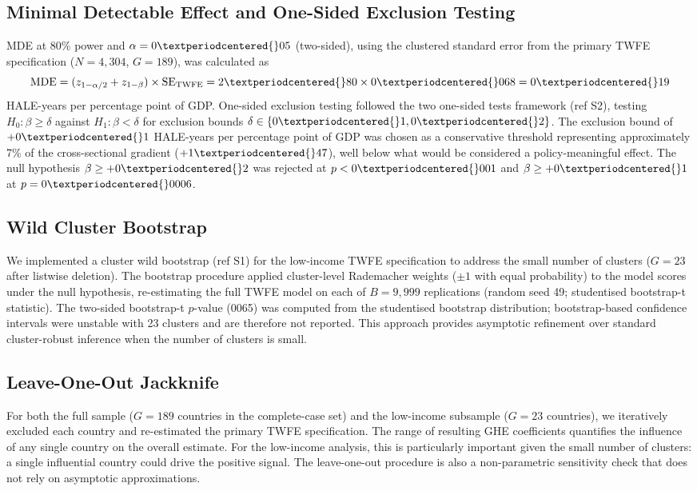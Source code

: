 \documentclass[10pt,a4paper]{article}
\begin{document}
\subsection{Minimal Detectable Effect and One-Sided Exclusion Testing}
MDE at 80\% power and $\alpha = 0{\textperiodcentered{}}05$ (two-sided), using the clustered standard error from the primary TWFE specification ($N = 4{,}304$, $G = 189$), was calculated as
\begin{equation}
\text{MDE} = (z_{1-\alpha/2} + z_{1-\beta}) \times \text{SE}_{\text{TWFE}} = 2{\textperiodcentered{}}80 \times 0{\textperiodcentered{}}068 = 0{\textperiodcentered{}}19
\end{equation}
HALE-years per percentage point of GDP. One-sided exclusion testing followed the two one-sided tests framework (ref S2), testing $H_0: \beta \geq \delta$ against $H_1: \beta < \delta$ for exclusion bounds $\delta \in \{0{\textperiodcentered{}}1, 0{\textperiodcentered{}}2\}$. The exclusion bound of $+0{\textperiodcentered{}}1$ HALE-years per percentage point of GDP was chosen as a conservative threshold representing approximately 7\% of the cross-sectional gradient ($+1{\textperiodcentered{}}47$), well below what would be considered a policy-meaningful effect. The null hypothesis $\beta \geq +0{\textperiodcentered{}}2$ was rejected at $p < 0{\textperiodcentered{}}001$ and $\beta \geq +0{\textperiodcentered{}}1$ at $p = 0{\textperiodcentered{}}0006$.

\subsection{Wild Cluster Bootstrap}
We implemented a cluster wild bootstrap (ref S1) for the low-income TWFE specification to address the small number of clusters ($G = 23$ after listwise deletion). The bootstrap procedure applied cluster-level Rademacher weights ($\pm 1$ with equal probability) to the model scores under the null hypothesis, re-estimating the full TWFE model on each of $B = 9{,}999$ replications (random seed 49; studentised bootstrap-t statistic). The two-sided bootstrap-t $p$-value (0{\textperiodcentered{}}065) was computed from the studentised bootstrap distribution; bootstrap-based confidence intervals were unstable with 23 clusters and are therefore not reported. This approach provides asymptotic refinement over standard cluster-robust inference when the number of clusters is small.

\subsection{Leave-One-Out Jackknife}
For both the full sample ($G = 189$ countries in the complete-case set) and the low-income subsample ($G = 23$ countries), we iteratively excluded each country and re-estimated the primary TWFE specification. The range of resulting GHE coefficients quantifies the influence of any single country on the overall estimate. For the low-income analysis, this is particularly important given the small number of clusters: a single influential country could drive the positive signal. The leave-one-out procedure is also a non-parametric sensitivity check that does not rely on asymptotic approximations.
\end{document}
